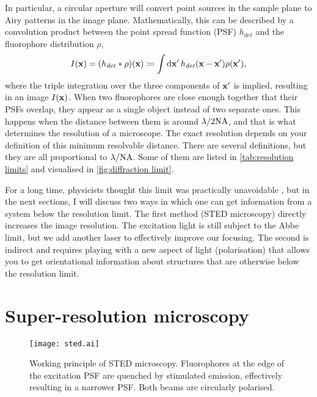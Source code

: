 In particular, a circular aperture will convert point sources in the sample plane to Airy patterns in the image plane. Mathematically, this can be described by a convolution product between the point spread function (PSF) $ h_\mathit{det} $ and the fluorophore distribution $ \rho $,
\begin{equation}
	I(\vb{x}) = (h_\mathit{det} * \rho)(\vb{x}) \coloneqq \int\dd{\vb{x}'} h_\mathit{det}(\vb{x}-\vb{x}')\rho(\vb{x}'),
	\label{eq:convolution}
\end{equation}
where the triple integration over the three components of $ \vb{x}' $ is implied, resulting in an image $ I(\vb{x}) $. When two fluorophores are close enough together that their PSFs overlap, they appear as a single object instead of two separate ones. This happens when the distance between them is around $ \lambda/2\mathrm{NA} $, and that is what determines the resolution of a microscope. The exact resolution depends on your definition of this minimum resolvable distance. There are several definitions, but they are all proportional to $ \lambda/\mathrm{NA} $. Some of them are listed in \autoref{tab:resolution limits} and visualised in \autoref{fig:diffraction limit}.



For a long time, physicists thought this limit was practically unavoidable \cite{McCutchen1967}, but in the next sections, I will discuss two ways in which one can get information from a system below the resolution limit. The first method (STED microscopy) directly increases the image resolution. The excitation light is still subject to the Abbe limit, but we add another laser to effectively improve our focusing. The second is indirect and requires playing with a new aspect of light (polarisation) that allows you to get orientational information about structures that are otherwise below the resolution limit.

\section{Super-resolution microscopy}

\begin{figure}
	\centering
	\texttt{[image: sted.ai]}
	\caption{
		Working principle of STED microscopy. Fluorophores at the edge of the excitation PSF are quenched by stimulated emission, effectively resulting in a narrower PSF. Both beams are circularly polarised. 
	}
	\label{fig:sted principle}
\end{figure}

